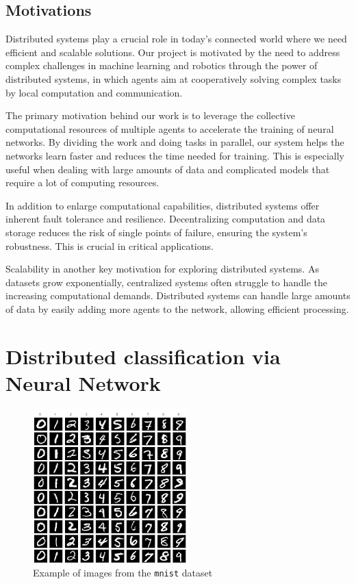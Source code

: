 \documentclass[a4paper,11pt,oneside]{book}
\begin{document}
\tableofcontents \thispagestyle{empty}

\newpage
\section*{Motivations} 
Distributed systems play a crucial role in today's connected world where we need efficient and scalable solutions. Our project is motivated by the need to address complex challenges in machine learning and robotics through the power of distributed systems, in which agents aim at cooperatively solving complex tasks by local computation and communication.

\bigskip
The primary motivation behind our work is to leverage the collective computational resources of multiple agents to accelerate the training of neural networks. By dividing the work and doing tasks in parallel, our system helps the networks learn faster and reduces the time needed for training. This is especially useful when dealing with large amounts of data and complicated models that require a lot of computing resources.

In addition to enlarge computational capabilities, distributed systems offer inherent fault tolerance and resilience. Decentralizing computation and data storage reduces the risk of single points of failure, ensuring the system's robustness. This is crucial in critical applications.

Scalability in another key motivation for exploring distributed systems. As datasets grow exponentially, centralized systems often struggle to handle the increasing computational demands. Distributed systems can handle large amounts of data by easily adding more agents to the network, allowing efficient processing.




\chapter{Distributed classification via Neural Network}

\begin{figure}
	\centering
	\includegraphics[scale=0.5]{mnist}
	\caption{Example of images from the \texttt{mnist} dataset}
	\label{mnist}
\end{figure}
\end{document}
